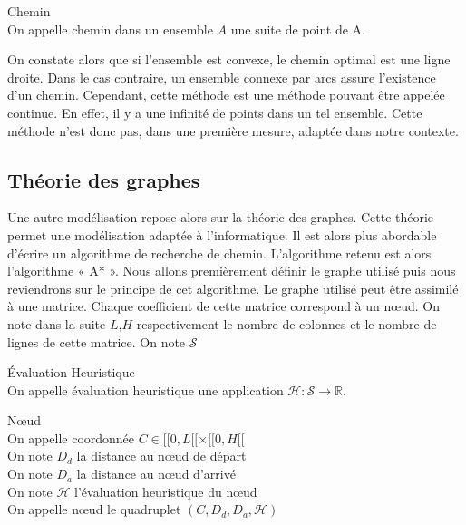 \begin{definition} Chemin \\
    On appelle chemin dans un ensemble $A$ une suite de point de A.
\end{definition} 

On constate alors que si l’ensemble est convexe, le chemin optimal est une ligne droite. Dans le cas contraire, un ensemble 
connexe par arcs assure l’existence d’un chemin. Cependant, cette méthode est une méthode pouvant être appelée continue. 
En effet, il y a une infinité de points dans un tel ensemble. Cette méthode n’est donc pas, dans une première mesure, 
adaptée dans notre contexte.

\subsection{Théorie des graphes}

Une autre modélisation repose alors sur la théorie des graphes. Cette théorie permet une modélisation adaptée à l’informatique. 
Il est alors plus abordable d’écrire un algorithme de recherche de chemin.
L’algorithme retenu est alors l’algorithme « A* ». 
Nous allons premièrement définir le graphe utilisé puis nous reviendrons sur le principe de cet algorithme.
Le graphe utilisé peut être assimilé à une matrice. Chaque coefficient de cette matrice correspond à un nœud. 
On note dans la suite $L$,$H$ respectivement le nombre de colonnes et le nombre de lignes de cette matrice. On note $\mathcal{S}$ 

\begin{definition} Évaluation Heuristique \\
    On appelle évaluation heuristique une application $\mathcal{H} : \mathcal{S} \longrightarrow \mathbb{R}$.
\end{definition} 

\begin{definition} Nœud \\
    On appelle coordonnée $C \in [\![0,L[\![ \times [\![0,H[\![$ \\
    On note $D_d$ la distance au nœud de départ \\
On note $D_a$ la distance au nœud d’arrivé \\
On note $\mathcal H$ l’évaluation heuristique du nœud \\
On appelle nœud le quadruplet $(C,D_d,D_a,\mathcal H)$ \\
\end{definition}

